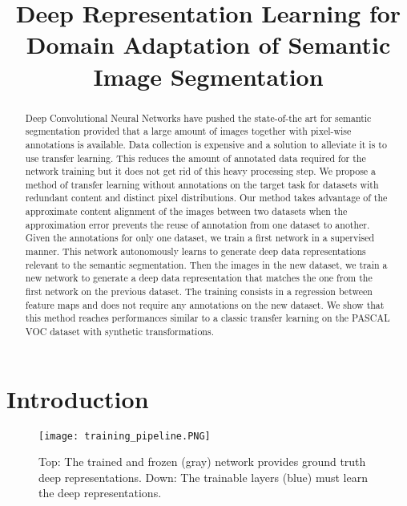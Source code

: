 \documentclass{bmvc2k}
\title{Deep Representation Learning for Domain Adaptation of
Semantic Image Segmentation}
\begin{document}
\maketitle

\begin{abstract}
Deep Convolutional Neural Networks have pushed the state-of-the art for semantic segmentation provided
that a large amount of images together with pixel-wise annotations is available. Data collection is 
expensive and a solution to alleviate it is to use transfer learning. 
This reduces the amount of annotated data required for the network training
but it does not get rid of this heavy processing step. 
We propose a method of transfer learning without annotations on the target task for
datasets with redundant content and distinct pixel distributions. 
Our method takes advantage of the approximate content alignment of the images 
between two datasets when the approximation error prevents the reuse of annotation from one dataset 
to another. Given the annotations for only one dataset, we train a first network in 
a supervised manner. This network autonomously learns to generate deep data representations
relevant to the semantic segmentation. Then the images in the new dataset, 
we train a new network to generate a deep data representation that matches 
the one from the first network on the previous dataset. 
The training consists in a regression between feature maps and does not require any annotations on the 
new dataset. We show that this method reaches performances similar to a classic transfer learning
on the PASCAL VOC dataset with synthetic transformations.
\end{abstract}

\section{Introduction}
\label{sec:intro}

\begin{figure}[thb]
  \centering
  \texttt{[image: training\_pipeline.PNG]}
  \caption{Top: The trained and frozen (gray) network provides ground truth deep representations. Down: The trainable layers (blue) must learn the deep representations.}
  \label{fig:method}
\end{figure}
\end{document}

